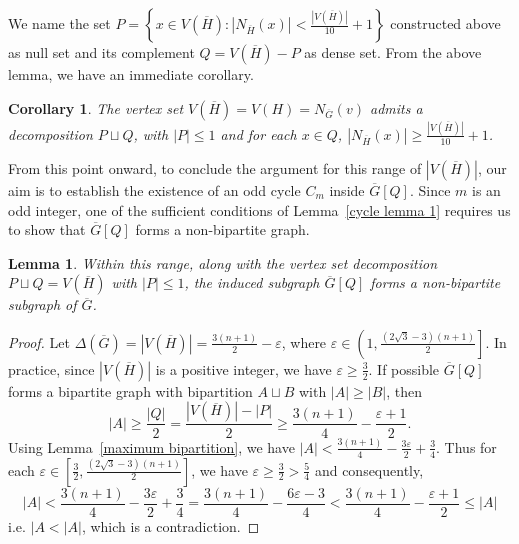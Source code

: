 \documentclass[reqno,10pt]{amsart}
\newtheorem{corollary}[theorem]{Corollary}
\newtheorem{lemma}[theorem]{Lemma}
\theoremstyle{definition}
\begin{document}
We name the set $P=\left\{x\in  V(\overline{H}): |N_{\overline{H}}(x)|<\frac{|V(\overline{H})|}{10}+1\right\}$ constructed above as null set and its complement $Q=V(\overline{H})-P$ as dense set. From the above lemma, we have an immediate corollary.


\begin{corollary}\label{decomposition lemma}
The vertex set $V(\overline{H})=V(H)=N_{\overline{G}}(v)$ admits a decomposition $P\sqcup Q$, with $|P|\leq1$ and for each $x\in Q$, $|N_{\overline{H}}(x)|\geq\frac{|V(\overline{H})|}{10}+1$.
\end{corollary}

From this point onward, to conclude the argument for this range of $|V(\overline{H})|$, our aim is to establish the existence of an odd cycle $C_{m}$ inside $\overline{G}[Q]$. Since $m$ is an odd integer, one of the sufficient conditions of Lemma~\ref{cycle lemma 1} requires us to show that $\overline{G}[Q]$ forms a non-bipartite graph.  

\begin{lemma}\label{nbd conservation}
Within this range, along with the vertex set decomposition $P\sqcup Q=V(\overline{H})$ with $|P|\leq 1$, the induced subgraph $\overline{G}[Q]$ forms a non-bipartite subgraph of $\overline{G}$. 
\end{lemma}
\begin{proof}
 Let $\Delta(\overline{G})=|V(\overline{H})|=\frac{3(n+1)}{2}-\varepsilon$, where $\varepsilon\in\left(1,\frac{(2\sqrt{3}-3)(n+1)}{2}\right]$. In practice, since $|V(\overline{H})|$ is a positive integer, we have  $\varepsilon\geq\frac{3}{2}$.  
If possible  $\overline{G}[Q]$ forms a bipartite graph with bipartition $A\sqcup B$ with $|A|\geq |B|$, then 
\begin{equation*}
|A|\geq \frac{|Q|}{2}=\frac{|V(\overline{H})|-|P|}{2}\geq\frac{3(n+1)}{4}-\frac{\varepsilon+1}{2}.    
\end{equation*}
Using Lemma~\ref{maximum bipartition}, we have $|A|<\frac{3(n+1)}{4}- \frac{3\varepsilon}{2}+\frac{3}{4}$. Thus for each $\varepsilon\in\left[\frac{3}{2},\frac{(2\sqrt{3}-3)(n+1)}{2}\right]$, we have  $\varepsilon\geq\frac{3}{2}>\frac{5}{4}$ and consequently,
\begin{equation*}
 |A|<\frac{3(n+1)}{4}- \frac{3\varepsilon}{2}+\frac{3}{4}=\frac{3(n+1)}{4}- \frac{6\varepsilon-3}{4}< \frac{3(n+1)}{4}-\frac{\varepsilon+1}{2}\leq |A|
\end{equation*}
i.e. $|A<|A|$,  which is a contradiction.
\end{proof}
\end{document}
